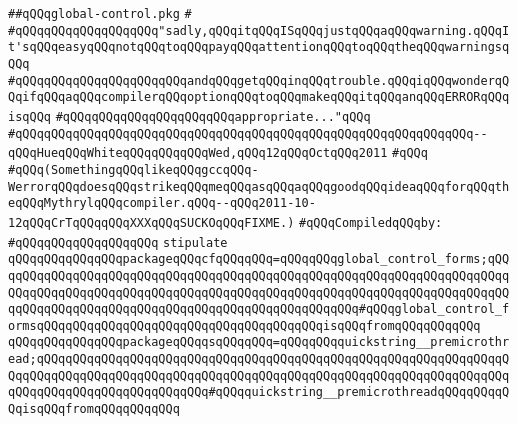 \label{src/lib/global-controls/global-control.pkg}
\verb|##qQQqglobal-control.pkg|\newline
\verb|#|\newline
\verb|#qQQqqQQqqQQqqQQqqQQq"sadly,qQQqitqQQqISqQQqjustqQQqaqQQqwarning.qQQqIt'sqQQqeasyqQQqnotqQQqtoqQQqpayqQQqattentionqQQqtoqQQqtheqQQqwarningsqQQq|\newline
\verb|#qQQqqQQqqQQqqQQqqQQqqQQqandqQQqgetqQQqinqQQqtrouble.qQQqiqQQqwonderqQQqifqQQqaqQQqcompilerqQQqoptionqQQqtoqQQqmakeqQQqitqQQqanqQQqERRORqQQqisqQQq|\newline
\verb|#qQQqqQQqqQQqqQQqqQQqqQQqappropriate..."qQQq|\newline
\verb|#qQQqqQQqqQQqqQQqqQQqqQQqqQQqqQQqqQQqqQQqqQQqqQQqqQQqqQQqqQQqqQQq--qQQqHueqQQqWhiteqQQqqQQqqQQqWed,qQQq12qQQqOctqQQq2011|\newline
\verb|#qQQq|\newline
\verb|#qQQq(SomethingqQQqlikeqQQqgccqQQq-WerrorqQQqdoesqQQqstrikeqQQqmeqQQqasqQQqaqQQqgoodqQQqideaqQQqforqQQqtheqQQqMythrylqQQqcompiler.qQQq--qQQq2011-10-12qQQqCrTqQQqqQQqXXXqQQqSUCKOqQQqFIXME.)|\newline
\newline
\verb|#qQQqCompiledqQQqby:|\newline
\verb|#qQQqqQQqqQQqqQQqqQQq|\newline
\newline
\newline
\verb|stipulate|\newline
\verb|qQQqqQQqqQQqqQQqpackageqQQqcfqQQqqQQq=qQQqqQQqglobal_control_forms;qQQqqQQqqQQqqQQqqQQqqQQqqQQqqQQqqQQqqQQqqQQqqQQqqQQqqQQqqQQqqQQqqQQqqQQqqQQqqQQqqQQqqQQqqQQqqQQqqQQqqQQqqQQqqQQqqQQqqQQqqQQqqQQqqQQqqQQqqQQqqQQqqQQqqQQqqQQqqQQqqQQqqQQqqQQqqQQqqQQqqQQqqQQqqQQq#qQQqglobal_control_formsqQQqqQQqqQQqqQQqqQQqqQQqqQQqqQQqqQQqqQQqisqQQqfromqQQqqQQqqQQq|\newline
\verb|qQQqqQQqqQQqqQQqpackageqQQqqsqQQqqQQq=qQQqqQQqquickstring__premicrothread;qQQqqQQqqQQqqQQqqQQqqQQqqQQqqQQqqQQqqQQqqQQqqQQqqQQqqQQqqQQqqQQqqQQqqQQqqQQqqQQqqQQqqQQqqQQqqQQqqQQqqQQqqQQqqQQqqQQqqQQqqQQqqQQqqQQqqQQqqQQqqQQqqQQqqQQqqQQqqQQqqQQq#qQQqquickstring__premicrothreadqQQqqQQqqQQqisqQQqfromqQQqqQQqqQQq|\newline
